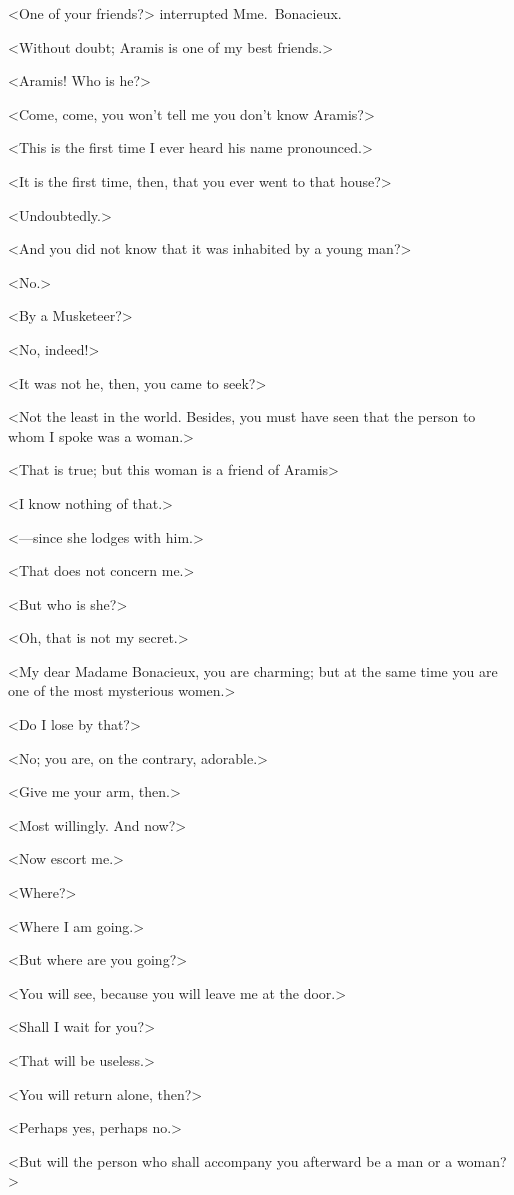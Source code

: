 <One of your friends?> interrupted Mme.~Bonacieux. 

<Without doubt; Aramis is one of my best friends.> 

<Aramis! Who is he?> 

<Come, come, you won't tell me you don't know Aramis?> 

<This is the first time I ever heard his name pronounced.> 

<It is the first time, then, that you ever went to that house?> 

<Undoubtedly.> 

<And you did not know that it was inhabited by a young man?> 

<No.> 

<By a Musketeer?> 

<No, indeed!> 

<It was not he, then, you came to seek?> 

<Not the least in the world. Besides, you must have seen that the person to whom I spoke was a woman.> 

<That is true; but this woman is a friend of Aramis\longdash> 

<I know nothing of that.> 

<—since she lodges with him.> 

<That does not concern me.> 

<But who is she?> 

<Oh, that is not my secret.> 

<My dear Madame Bonacieux, you are charming; but at the same time you are one of the most mysterious women.> 

<Do I lose by that?> 

<No; you are, on the contrary, adorable.> 

<Give me your arm, then.> 

<Most willingly. And now?> 

<Now escort me.> 

<Where?> 

<Where I am going.> 

<But where are you going?> 

<You will see, because you will leave me at the door.> 

<Shall I wait for you?> 

<That will be useless.> 

<You will return alone, then?> 

<Perhaps yes, perhaps no.> 

<But will the person who shall accompany you afterward be a man or a woman?> 


